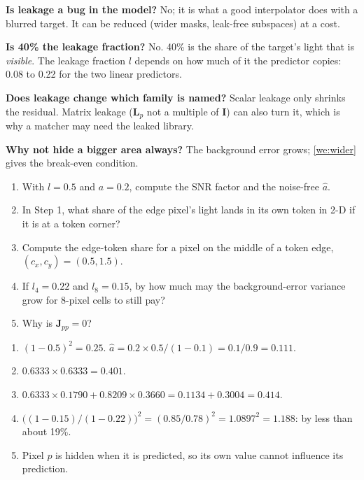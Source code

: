 \documentclass[11pt,a4paper,oneside,openany]{book}
\newcommand{\B}[1]{{\symbf{#1}}}
\newcommand{\B}[1]{{\bm{#1}}}
\newcommand{\mJ}{\B{J}}
\newcommand{\mL}{\B{L}}
\newcommand{\mI}{\B{I}}
\newcommand{\ahat}{\hat a}
\begin{document}
\begin{confusions}
\textbf{Is leakage a bug in the model?} No; it is what a good interpolator does with a blurred target. It can be reduced (wider masks, leak-free subspaces) at a cost.

\textbf{Is 40\% the leakage fraction?} No. 40\% is the share of the target's light that is \emph{visible}. The leakage fraction $l$ depends on how much of it the
predictor copies: 0.08 to 0.22 for the two linear predictors.

\textbf{Does leakage change which family is named?} Scalar leakage only shrinks the residual. Matrix leakage ($\mL_p$ not a multiple of $\mI$) can also turn it, which
is why a matcher may need the leaked library.

\textbf{Why not hide a bigger area always?} The background error grows; \cref{we:wider} gives the break-even condition.
\end{confusions}

\begin{checkyourself}
\begin{enumerate}
\item With $l=0.5$ and $a=0.2$, compute the SNR factor and the noise-free $\ahat$.
\item In Step 1, what share of the edge pixel's light lands in its own token in 2-D if it is at a token corner?
\item Compute the edge-token share for a pixel on the middle of a token edge, $(c_x,c_y)=(0.5,1.5)$.
\item If $l_4=0.22$ and $l_8=0.15$, by how much may the background-error variance grow for 8-pixel cells to still pay?
\item Why is $\mJ_{pp}=0$?
\end{enumerate}
\end{checkyourself}

\begin{answers}
\begin{enumerate}
\item $(1-0.5)^2=0.25$. $\ahat=0.2\times0.5/(1-0.1)=0.1/0.9=0.111$.
\item $0.6333\times0.6333=0.401$.
\item $0.6333\times0.1790+0.8209\times0.3660=0.1134+0.3004=0.414$.
\item $\big((1-0.15)/(1-0.22)\big)^2=(0.85/0.78)^2=1.0897^2=1.188$: by less than about 19\%.
\item Pixel $p$ is hidden when it is predicted, so its own value cannot influence its prediction.
\end{enumerate}
\end{answers}
\end{document}
